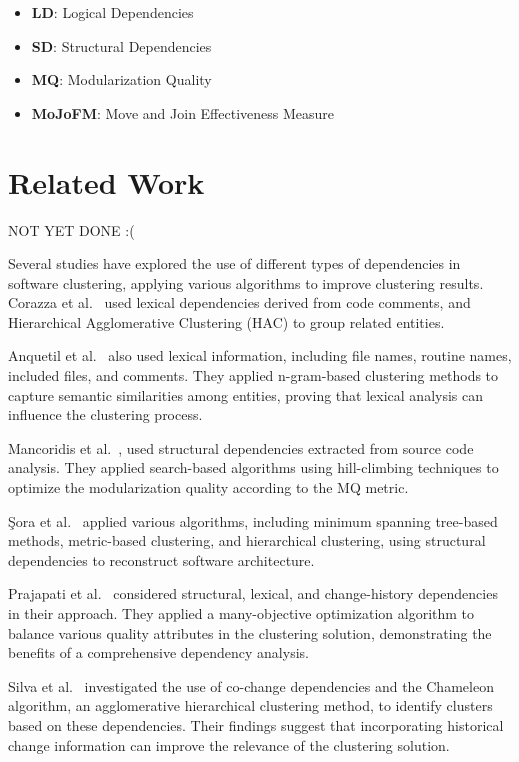 \documentclass{ieeeaccess}
\begin{document}
\begin{itemize}
    \item \textbf{LD}: Logical Dependencies
    \item \textbf{SD}: Structural Dependencies
    \item \textbf{MQ}: Modularization Quality
    \item \textbf{MoJoFM}: Move and Join Effectiveness Measure
\end{itemize}

\section{Related Work}
\label{sec:related_work}
NOT YET DONE :(

Several studies have explored the use of different types of dependencies in software clustering, applying various algorithms to improve clustering results. Corazza et al.~\cite{b13} used lexical dependencies derived from code comments, and Hierarchical Agglomerative Clustering (HAC) to group related entities. 

Anquetil et al.~\cite{b14} also used lexical information, including file names, routine names, included files, and comments. They applied n-gram-based clustering methods to capture semantic similarities among entities, proving that lexical analysis can influence the clustering process.

Mancoridis et al.~\cite{b10}, \cite{b101} used structural dependencies extracted from source code analysis. They applied search-based algorithms using hill-climbing techniques to optimize the modularization quality according to the MQ metric. 

Şora et al.~\cite{b12} applied various algorithms, including minimum spanning tree-based methods, metric-based clustering, and hierarchical clustering, using structural dependencies to reconstruct software architecture.

Prajapati et al.~\cite{b18} considered structural, lexical, and change-history dependencies in their approach. They applied a many-objective optimization algorithm to balance various quality attributes in the clustering solution, demonstrating the benefits of a comprehensive dependency analysis.

Silva et al.~\cite{b16} investigated the use of co-change dependencies and the Chameleon algorithm, an agglomerative hierarchical clustering method, to identify clusters based on these dependencies. Their findings suggest that incorporating historical change information can improve the relevance of the clustering solution.
\end{document}
